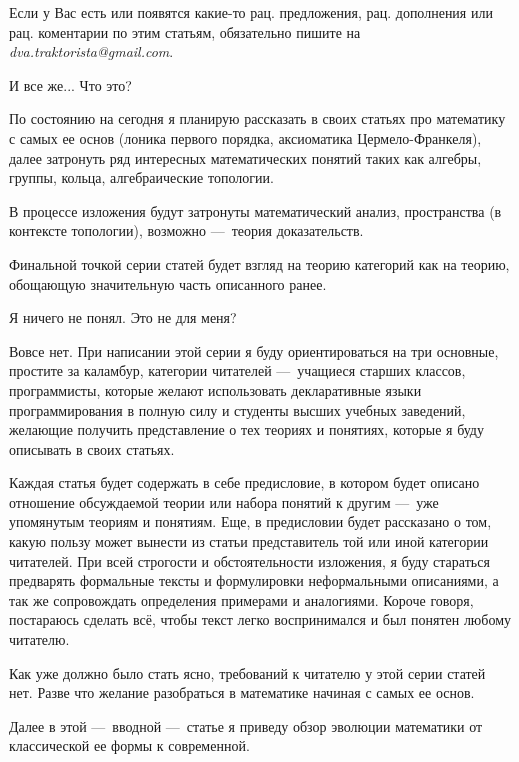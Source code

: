 \documentclass[math.tex]{subfiles}
\begin{document}
	
	Если у Вас есть или появятся какие-то рац. предложения, рац. дополнения или рац. коментарии по этим статьям, обязательно пишите на \emph{dva.traktorista@gmail.com}.

	\vspace{1cm}
	\LARGE{И все же... Что это?}\\
	\normalsize
	
	По состоянию на сегодня я планирую рассказать в своих статьях про математику с самых ее основ (лоника первого порядка, аксиоматика Цермело-Франкеля), далее затронуть ряд интересных математических понятий таких как алгебры, группы, кольца, алгебраические топологии. 
	
	В процессе изложения будут затронуты мат\-ематический анализ, пространства (в контексте топологии), возможно —\ теория доказательств.
	
	Финальной точкой серии статей будет взгляд на теорию категорий как на теорию, обощающую значительную часть описанного ранее.
	
	\vspace{1cm}
	\LARGE{Я ничего не понял. Это не для меня?}\\
	\normalsize
	
	Вовсе нет. 
При написании этой серии я буду ориентироваться на три основные, простите за каламбур, категории читателей —\ учащиеся старших классов, программисты, которые желают использовать деклар\-ативные языки программирования в полную силу и студенты высших учебных заведений, желающие получить пред\-ставление о тех теориях и понятиях, которые я буду описывать в своих статьях.
	
	Каждая статья будет содержать в себе предисловие, в котором будет описано отношение обсуждаемой теории или набора понятий к другим —\ уже упомянутым теориям и понятиям. 
Еще, в предисловии будет рассказано о том, какую пользу может вынести из статьи представитель той или
иной категории читателей.
При всей строгости и обстоятельности изложения, я буду стараться предварять фор\-мальные тексты и формулировки неформальными описаниями, а так же сопро\-вождать опре\-деления примерами и аналогиями.
Короче говоря, постараюсь сделать всё, чтобы текст легко воспринимался и был понятен любому читателю.

	Как уже должно было стать ясно, требований к читателю у этой серии статей нет. Разве что
желание разобраться в математике начиная с самых ее основ.
	
	Далее в этой —\ вводной —\ статье я приведу обзор эволюции математики от классической ее формы
к современной.
	
\end{document}
